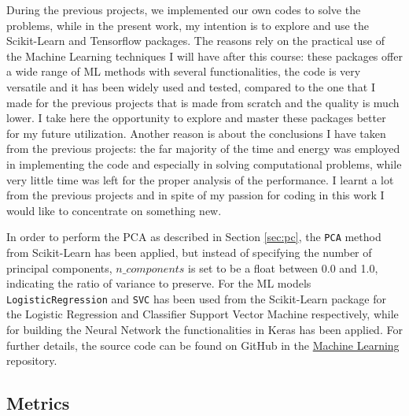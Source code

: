 \documentclass[english,notitlepage,reprint,nofootinbib]{revtex4-1}  %
\begin{document}
During the previous projects, we implemented our own codes to solve the problems, while in the present work, my intention is to explore and use the Scikit-Learn \cite{sk} and Tensorflow \cite{tf} packages. The reasons rely on the practical use of the Machine Learning techniques I will have after this course: these packages offer a wide range of ML methods with several functionalities, the code is very versatile and it has been widely used and tested, compared to the one that I made for the previous projects that is made from scratch and the quality is much lower. I take here the opportunity to explore and master these packages better for my future utilization. Another reason is about the conclusions I have taken from the previous projects: the far majority of the time and energy was employed in implementing the code and especially in solving computational problems, while very little time was left for the proper analysis of the performance. I learnt a lot from the previous projects and in spite of my passion for coding in this work I would like to concentrate on something new.

In order to perform the PCA as described in Section \ref{sec:pc}, the \texttt{PCA} method from Scikit-Learn has been applied, but instead of specifying the number of principal components, $n\_components$ is set to be a float between 0.0 and 1.0, indicating the ratio of variance to preserve. For the ML models \texttt{LogisticRegression} and \texttt{SVC} has been used from the Scikit-Learn package for the Logistic Regression and Classifier Support Vector Machine respectively, while for building the Neural Network the functionalities in Keras \cite{keras} has been applied. For further details, the source code can be found on GitHub in the \href{https://github.com/adelezaini/MachineLearning/tree/master/Projects/Project3}{Machine Learning} repository.


\subsection{Metrics}
\end{document}
